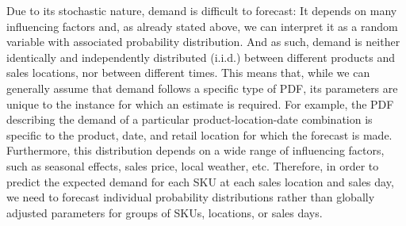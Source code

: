\documentclass[BCOR=1mm, DIV=calc,10pt,
twoside=true,
twocolumn,
headings=normal]{scrartcl}
\begin{document}
Due to its stochastic nature, demand is difficult to forecast: It depends on many influencing factors and, as already stated above, we can interpret it as a random variable with associated probability distribution. And as such, demand is neither identically and independently distributed (i.i.d.) between different products and sales locations, nor between different times. This means that, while we can generally assume that demand follows a specific type of PDF, its parameters are unique to the instance for which an estimate is required. For example, the PDF describing the demand of a particular product-location-date combination is specific to the product, date, and retail location for which the forecast is made. Furthermore, this distribution depends on a wide range of influencing factors, such as seasonal effects, sales price, local weather, etc. Therefore, in order to predict the expected demand for each SKU at each sales location and sales day, we need to forecast individual probability distributions rather than globally adjusted parameters for groups of SKUs, locations, or sales days.
\end{document}
